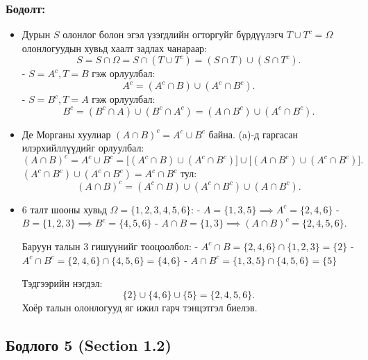 \documentclass[11pt,a4paper]{article}
\begin{document}
\subsubsection*{Бодолт:}

\begin{itemize}[leftmargin=1.4em, itemsep=3pt]
  \item[\textbf{(a)}] Дурын $S$ олонлог болон эгэл үзэгдлийн огторгуйг бүрдүүлэгч $T \cup T^c = \Omega$ олонлогуудын хувьд хаалт задлах чанараар:
  \[
    S = S \cap \Omega = S \cap (T \cup T^c) = (S \cap T) \cup (S \cap T^c).
  \]
  - $S = A^c, T = B$ гэж орлуулбал:
    \[
      A^c = (A^c \cap B) \cup (A^c \cap B^c).
    \]
  - $S = B^c, T = A$ гэж орлуулбал:
    \[
      B^c = (B^c \cap A) \cup (B^c \cap A^c) = (A \cap B^c) \cup (A^c \cap B^c).
    \]

  \item[\textbf{(б)}] Де Морганы хуулиар $(A \cap B)^c = A^c \cup B^c$ байна. (a)-д гаргасан илэрхийллүүдийг орлуулбал:
  \[
    (A \cap B)^c = A^c \cup B^c = \big[(A^c \cap B) \cup (A^c \cap B^c)\big] \cup \big[(A \cap B^c) \cup (A^c \cap B^c)\big].
  \]
  $(A^c \cap B^c) \cup (A^c \cap B^c) = A^c \cap B^c$ тул:
  \[
    (A \cap B)^c = (A^c \cap B) \cup (A^c \cap B^c) \cup (A \cap B^c).
  \]

  \item[\textbf{(в)}] 6 талт шооны хувьд $\Omega = \{1, 2, 3, 4, 5, 6\}$:
  - $A = \{1, 3, 5\} \implies A^c = \{2, 4, 6\}$
  - $B = \{1, 2, 3\} \implies B^c = \{4, 5, 6\}$
  - $A \cap B = \{1, 3\} \implies (A \cap B)^c = \{2, 4, 5, 6\}$.

  Баруун талын 3 гишүүнийг тооцоолбол:
  - $A^c \cap B = \{2, 4, 6\} \cap \{1, 2, 3\} = \{2\}$
  - $A^c \cap B^c = \{2, 4, 6\} \cap \{4, 5, 6\} = \{4, 6\}$
  - $A \cap B^c = \{1, 3, 5\} \cap \{4, 5, 6\} = \{5\}$

  Тэдгээрийн нэгдэл:
  \[
    \{2\} \cup \{4, 6\} \cup \{5\} = \{2, 4, 5, 6\}.
  \]
  Хоёр талын олонлогууд яг ижил гарч тэнцэтгэл биелэв.
\end{itemize}

\vspace{0.8em}

\subsection*{Бодлого 5 (Section 1.2)}
\end{document}
